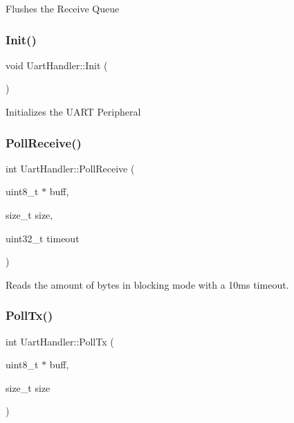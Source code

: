 Flushes the Receive Queue \mbox{\label{classdaisy_1_1_uart_handler_a7856843dd69d064a29ca437898fc00c4}} 
\subsubsection{\texorpdfstring{Init()}{Init()}}
{\footnotesize\ttfamily void Uart\+Handler\+::\+Init (\begin{DoxyParamCaption}{ }\end{DoxyParamCaption})}

Initializes the U\+A\+RT Peripheral \mbox{\label{classdaisy_1_1_uart_handler_a7dd43d5317cc970d3475be9dcc1b1279}} 
\subsubsection{\texorpdfstring{Poll\+Receive()}{PollReceive()}}
{\footnotesize\ttfamily int Uart\+Handler\+::\+Poll\+Receive (\begin{DoxyParamCaption}\item[{uint8\+\_\+t $\ast$}]{buff,  }\item[{size\+\_\+t}]{size,  }\item[{uint32\+\_\+t}]{timeout }\end{DoxyParamCaption})}

Reads the amount of bytes in blocking mode with a 10ms timeout. \mbox{\label{classdaisy_1_1_uart_handler_ad2a5e2326d8f7053a3f84600b1fbbc0e}} 
\subsubsection{\texorpdfstring{Poll\+Tx()}{PollTx()}}
{\footnotesize\ttfamily int Uart\+Handler\+::\+Poll\+Tx (\begin{DoxyParamCaption}\item[{uint8\+\_\+t $\ast$}]{buff,  }\item[{size\+\_\+t}]{size }\end{DoxyParamCaption})}

